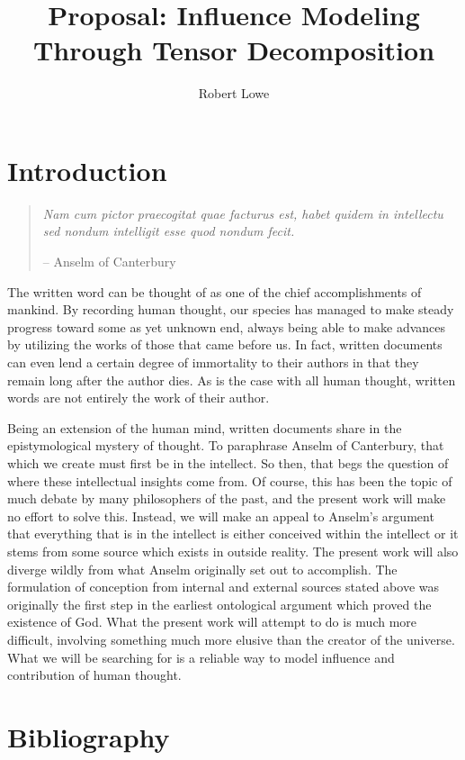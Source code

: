 \documentclass{article}
\title{Proposal: Influence Modeling Through Tensor Decomposition}
\author{Robert Lowe}
\begin{document}
\maketitle

\section{Introduction}
\begin{quote}
\textit{Nam cum pictor praecogitat quae facturus est, habet quidem in intellectu sed nondum intelligit esse quod nondum fecit.}

-- Anselm of Canterbury~\cite{anselm}
\end{quote}

The written word can be thought of as one of the chief accomplishments of mankind.  By recording human thought, our species has managed to make steady progress toward some as yet unknown end, always being able to make advances by utilizing the works of those that came before us.  In fact, written documents can even lend a certain degree of immortality to their authors in that they remain long after the author dies.  As is the case with all human thought, written words are not entirely the work of their author.

Being an extension of the human mind, written documents share in the epistymological mystery of thought.  To paraphrase Anselm of Canterbury, that which we create must first be in the intellect.  So then, that begs the question of where these intellectual insights come from.  Of course, this has been the topic of much debate by many philosophers of the past, and the present work will make no effort to solve this.  Instead, we will make an appeal to Anselm's argument that everything that is in the intellect is either conceived within the intellect or it stems from some source which exists in outside reality.  The present work will also diverge wildly from what Anselm originally set out to accomplish.  The formulation of conception from internal and external sources stated above was originally the first step in the earliest ontological argument which proved the existence of God.  What the present work will attempt to do is much more difficult, involving something much more elusive than the creator of the universe.  What we will be searching for is a reliable way to model influence and contribution of human thought.


\section{Bibliography}
{}

\end{document}
